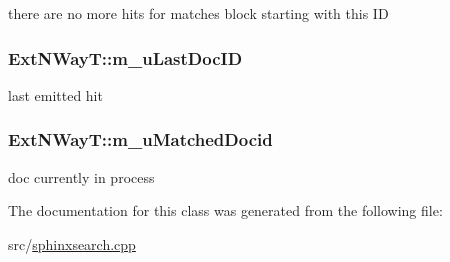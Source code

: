 there are no more hits for matches block starting with this I\-D 

\hypertarget{classExtNWayT_a48e5113ea25eec491cd4b08dfb5b595a}{
\subsubsection[{m\-\_\-u\-Last\-Doc\-I\-D}]{ Ext\-N\-Way\-T\-::m\-\_\-u\-Last\-Doc\-I\-D\hspace{0.3cm}{\ttfamily [protected]}}}\label{classExtNWayT_a48e5113ea25eec491cd4b08dfb5b595a}


last emitted hit 

\hypertarget{classExtNWayT_a0193e0fa0a57905a1cf33035c58d8628}{
\subsubsection[{m\-\_\-u\-Matched\-Docid}]{ Ext\-N\-Way\-T\-::m\-\_\-u\-Matched\-Docid\hspace{0.3cm}{\ttfamily [protected]}}}\label{classExtNWayT_a0193e0fa0a57905a1cf33035c58d8628}


doc currently in process 



The documentation for this class was generated from the following file\-:\begin{DoxyCompactItemize}
\item 
src/\hyperlink{sphinxsearch_8cpp}{sphinxsearch.\-cpp}\end{DoxyCompactItemize}
